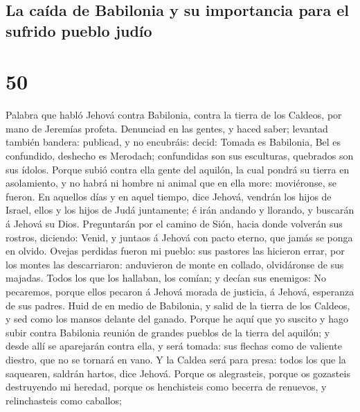 \hypertarget{la-cauxedda-de-babilonia-y-su-importancia-para-el-sufrido-pueblo-juduxedo}{%
\subsection{La caída de Babilonia y su importancia para el sufrido
pueblo
judío}\label{la-cauxedda-de-babilonia-y-su-importancia-para-el-sufrido-pueblo-juduxedo}}

\hypertarget{section-24-50}{%
\section{50}\label{section-24-50}}

 Palabra que habló Jehová contra Babilonia, contra la
tierra de los Caldeos, por mano de Jeremías profeta. 
Denunciad en las gentes, y haced saber; levantad también bandera:
publicad, y no encubráis: decid: Tomada es Babilonia, Bel es confundido,
deshecho es Merodach; confundidas son sus esculturas, quebrados son sus
ídolos.  Porque subió contra ella gente del aquilón, la
cual pondrá su tierra en asolamiento, y no habrá ni hombre ni animal que
en ella more: moviéronse, se fueron.  En aquellos días y
en aquel tiempo, dice Jehová, vendrán los hijos de Israel, ellos y los
hijos de Judá juntamente; é irán andando y llorando, y buscarán á Jehová
su Dios.  Preguntarán por el camino de Sión, hacia donde
volverán sus rostros, diciendo: Venid, y juntaos á Jehová con pacto
eterno, que jamás se ponga en olvido.  Ovejas perdidas
fueron mi pueblo: sus pastores las hicieron errar, por los montes las
descarriaron: anduvieron de monte en collado, olvidáronse de sus
majadas.  Todos los que los hallaban, los comían; y decían
sus enemigos: No pecaremos, porque ellos pecaron á Jehová morada de
justicia, á Jehová, esperanza de sus padres.  Huid de en
medio de Babilonia, y salid de la tierra de los Caldeos, y sed como los
mansos delante del ganado.  Porque he aquí que yo suscito
y hago subir contra Babilonia reunión de grandes pueblos de la tierra
del aquilón; y desde allí se aparejarán contra ella, y será tomada: sus
flechas como de valiente diestro, que no se tornará en vano.
 Y la Caldea será para presa: todos los que la saquearen,
saldrán hartos, dice Jehová.  Porque os alegrasteis,
porque os gozasteis destruyendo mi heredad, porque os henchisteis como
becerra de renuevos, y relinchasteis como caballos; 
